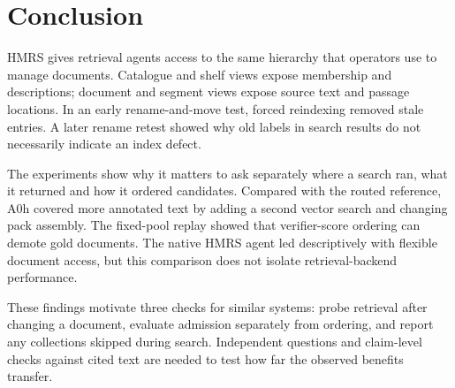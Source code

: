 \section{Conclusion}
\label{sec:conclusion}
HMRS gives retrieval agents access to the same hierarchy that operators use
to manage documents. Catalogue and shelf views expose membership and
descriptions; document and segment views expose source text and passage
locations. In an early rename-and-move test, forced reindexing removed stale
entries. A later rename retest showed why old labels in search results do not
necessarily indicate an index defect.

The experiments show why it matters to ask separately where a search ran,
what it returned and how it ordered candidates. Compared with the routed
reference, A0h covered more annotated text by adding a second vector search
and changing pack assembly. The fixed-pool
replay showed that verifier-score ordering can demote gold documents. The
native HMRS agent led descriptively with flexible document access, but this
comparison does not isolate retrieval-backend performance.

These findings motivate three checks for similar systems: probe retrieval
after changing a document, evaluate admission separately from ordering,
and report any collections skipped during search. Independent questions
and claim-level checks against cited text are needed to test how far the
observed benefits transfer.
